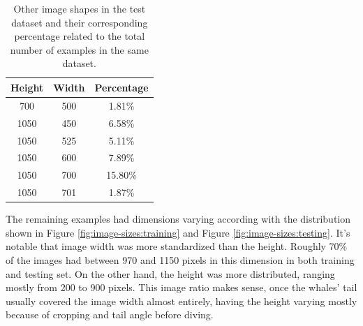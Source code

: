 \documentclass[12pt,
    brazil,			%
	english,        %
	]{article}
\begin{document}
\begin{table}[htb]
    \centering
    \setlength{\tabcolsep}{25pt} %
    \renewcommand{\arraystretch}{1.5} %
    \begin{tabular}{ccc}
        \hline \hline
        Height & Width & Percentage \\
        \hline
            700     &   500 &   1.81\% \\
            1050    &   450 &   6.58\% \\
            1050    &   525 &   5.11\% \\
            1050    &   600 &   7.89\% \\
            1050    &   700 &   15.80\% \\
            1050    &   701 &   1.87\% \\
        \hline \hline
    \end{tabular}
    \caption{Other image shapes in the test dataset and their corresponding percentage related to the total number of examples in the same dataset.}
    \label{tab:image-sizes:testing}
\end{table}

The remaining examples had dimensions varying according with the distribution shown in Figure \ref{fig:image-sizes:training} and Figure \ref{fig:image-sizes:testing}. It's notable that image width was more standardized than the height. Roughly 70\% of the images had between 970 and 1150 pixels in this dimension in both training and testing set. On the other hand, the height was more distributed, ranging mostly from  200 to 900 pixels. This image ratio makes sense, once the whales' tail usually covered the image width almost entirely, having the height varying mostly because of cropping and tail angle before diving.
\end{document}
